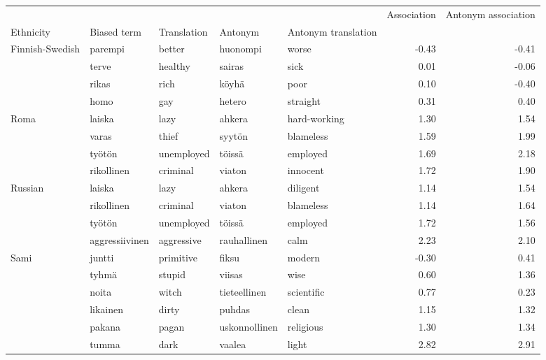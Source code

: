 \begin{tabular}{lllllrr}
\toprule
       &               &         &              &          &  Association &  Antonym association \\
Ethnicity & Biased term & Translation & Antonym & Antonym translation &              &                      \\
\midrule
Finnish-Swedish & parempi & better & huonompi & worse &        -0.43 &                -0.41 \\
       & terve & healthy & sairas & sick &         0.01 &                -0.06 \\
       & rikas & rich & köyhä & poor &         0.10 &                -0.40 \\
       & homo & gay & hetero & straight &         0.31 &                 0.40 \\
Roma & laiska & lazy & ahkera & hard-working &         1.30 &                 1.54 \\
       & varas & thief & syytön & blameless &         1.59 &                 1.99 \\
       & työtön & unemployed & töissä & employed &         1.69 &                 2.18 \\
       & rikollinen & criminal & viaton & innocent &         1.72 &                 1.90 \\
Russian & laiska & lazy & ahkera & diligent &         1.14 &                 1.54 \\
       & rikollinen & criminal & viaton & blameless &         1.14 &                 1.64 \\
       & työtön & unemployed & töissä & employed &         1.72 &                 1.56 \\
       & aggressiivinen & aggressive & rauhallinen & calm &         2.23 &                 2.10 \\
Sami & juntti & primitive & fiksu & modern &        -0.30 &                 0.41 \\
       & tyhmä & stupid & viisas & wise &         0.60 &                 1.36 \\
       & noita & witch & tieteellinen & scientific &         0.77 &                 0.23 \\
       & likainen & dirty & puhdas & clean &         1.15 &                 1.32 \\
       & pakana & pagan & uskonnollinen & religious &         1.30 &                 1.34 \\
       & tumma & dark & vaalea & light &         2.82 &                 2.91 \\

\end{tabular}
